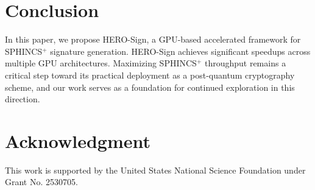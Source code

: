 \documentclass[10pt,conference]{IEEEtran}
\begin{document}
\vspace{-0.3cm}
\section{Conclusion}
\label{sec:con}
In this paper, we propose HERO-Sign, a GPU-based accelerated framework for SPHINCS$^+$ signature generation. HERO-Sign achieves significant speedups across multiple GPU architectures. Maximizing SPHINCS$^+$ throughput remains a critical step toward its practical deployment as a post-quantum cryptography scheme, and our work serves as a foundation for continued exploration in this direction.

\section*{Acknowledgment}
This work is supported by the United States National Science Foundation under Grant No. 2530705.











\end{document}
